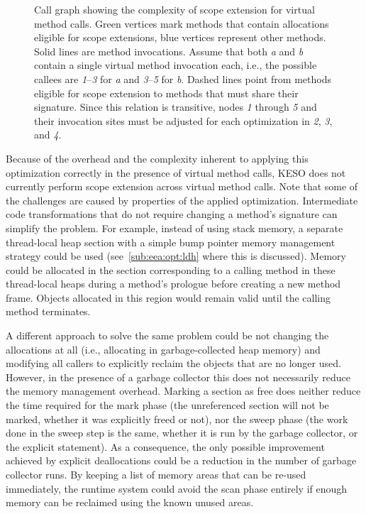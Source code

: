 			\begin{figure}
				\centering%

				\caption[Call graph showing the complexity of scope extension for virtual method calls]{%
					Call graph showing the complexity of scope extension for virtual method calls. Green
					{\color{cggreen}\blacksquare} vertices mark methods that contain allocations eligible for scope extensions,
					blue {\color{cgblue}\blacksquare} vertices represent other methods. Solid lines are method invocations. Assume
					that both \emph{a} and \emph{b} contain a single virtual method invocation each, i.e., the possible callees
					are \emph{1}–\emph{3} for \emph{a} and \emph{3}–\emph{5} for \emph{b}. Dashed lines point from methods
					eligible for scope extension to methods that must share their signature. Since this relation is transitive,
					nodes \emph{1} through \emph{5} and their invocation sites must be adjusted for each optimization in \emph{2},
					\emph{3}, and \emph{4}.}%
				\label{fig:eea:analysis:virtual}%
			\end{figure}

			Because of the overhead and the complexity inherent to applying this optimization correctly in the presence of
			virtual method calls, KESO does not currently perform scope extension across virtual method calls. Note that some
			of the challenges are caused by properties of the applied optimization. Intermediate code transformations that do
			not require changing a method's signature can simplify the problem. For example, instead of using stack memory,
			a separate thread-local heap section with a simple bump pointer memory management strategy could be used
			(see~\cref{sub:eea:opt:ldh} where this is discussed). Memory could be allocated in the section corresponding to
			a calling method in these thread-local heaps during a method's prologue before creating a new method frame.
			Objects allocated in this region would remain valid until the calling method terminates.

			A different approach to solve the same problem could be not changing the allocations at all (i.e., allocating in
			garbage-collected heap memory) and modifying all callers to explicitly reclaim the objects that are no longer
			used. However, in the presence of a garbage collector this does not necessarily reduce the memory management
			overhead. Marking a section as free does neither reduce the time required for the mark phase (the unreferenced
			section will not be marked, whether it was explicitly freed or not), nor the sweep phase (the work done in the
			sweep step is the same, whether it is run by the garbage collector, or the explicit statement). As a consequence,
			the only possible improvement achieved by explicit deallocations could be a reduction in the number of garbage
			collector runs. By keeping a list of memory areas that can be re-used immediately, the runtime system could avoid
			the scan phase entirely if enough memory can be reclaimed using the known unused areas.

